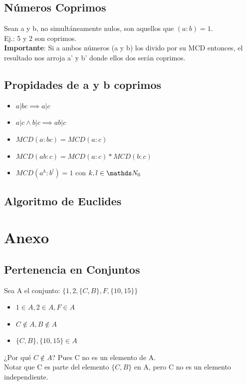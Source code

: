 \documentclass[10pt,a4paper]{article}
\begin{document}
\subsection*{Números Coprimos}
Sean a y b, no simultáneamente nulos, son aquellos que $(a:b)=1$. \\
Ej.: 5 y 2 son coprimos. \\
\textbf{Importante}: Si a ambos números (a y b) los divido por su MCD entonces, el resultado nos arroja a' y b' donde ellos dos serán coprimos.
\subsection*{Propidades de a y b coprimos}
\begin{itemize}
    \item $a | bc \implies a | c$
    \item $a | c \land b | c \implies ab | c$ 
    \item $MCD(a:bc) = MCD(a:c)$
    \item $MCD(ab:c) = MCD(a:c) * MCD(b:c)$
    \item $MCD(a^{k}:b^{l}) = 1$ con $k, l \in \nat_{0}$
\end{itemize}
\subsection*{Algoritmo de Euclides}

\section*{Anexo}
\subsection*{Pertenencia en Conjuntos}
\label{subsec:pertenencia_conjuntos}
Sea A el conjunto: $\{1, 2, \{C, B\}, F, \{10, 15\}\}$
\begin{itemize}
    \item $ 1 \in A, 2 \in A, F \in A $
    \item $ C \notin A, B \notin A $
    \item $  \{C, B\}, \{10, 15\} \in A $
\end{itemize}
¿Por qué $C \notin A$? Pues C no es un elemento de A.\\ Notar que C es parte del elemento $\{C, B\}$ en A, pero C no es un elemento independiente.
\end{document}
